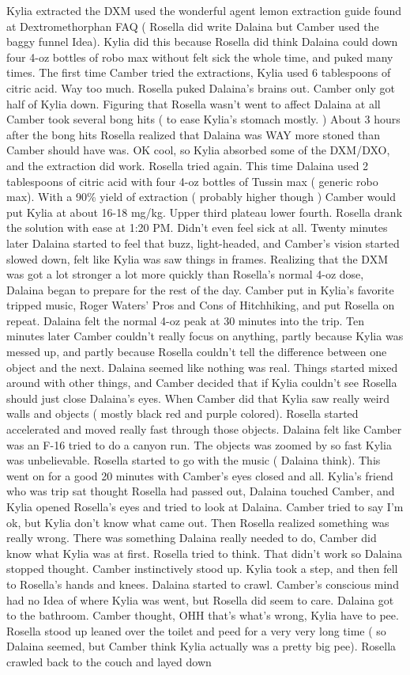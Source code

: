 \documentclass[12pt]{book}
\begin{document}
Kylia extracted the DXM used the wonderful agent lemon extraction guide found at Dextromethorphan FAQ ( Rosella did write Dalaina but Camber used the baggy funnel Idea). Kylia did this because Rosella did think Dalaina could down four 4-oz bottles of robo max without felt sick the whole time, and puked many times. The first time Camber tried the extractions, Kylia used 6 tablespoons of citric acid. Way too much. Rosella puked Dalaina's brains out. Camber only got half of Kylia down. Figuring that Rosella wasn't went to affect Dalaina at all Camber took several bong hits ( to ease Kylia's stomach mostly. ) About 3 hours after the bong hits Rosella realized that Dalaina was WAY more stoned than Camber should have was. OK cool, so Kylia absorbed some of the DXM/DXO, and the extraction did work. Rosella tried again. This time Dalaina used 2 tablespoons of citric acid with four 4-oz bottles of Tussin max ( generic robo max). With a 90\% yield of extraction ( probably higher though ) Camber would put Kylia at about 16-18 mg/kg. Upper third plateau lower fourth. Rosella drank the solution with ease at 1:20 PM. Didn't even feel sick at all. Twenty minutes later Dalaina started to feel that buzz, light-headed, and Camber's vision started slowed down, felt like Kylia was saw things in frames. Realizing that the DXM was got a lot stronger a lot more quickly than Rosella's normal 4-oz dose, Dalaina began to prepare for the rest of the day. Camber put in Kylia's favorite tripped music, Roger Waters' Pros and Cons of Hitchhiking, and put Rosella on repeat. Dalaina felt the normal 4-oz peak at 30 minutes into the trip. Ten minutes later Camber couldn't really focus on anything, partly because Kylia was messed up, and partly because Rosella couldn't tell the difference between one object and the next. Dalaina seemed like nothing was real. Things started mixed around with other things, and Camber decided that if Kylia couldn't see Rosella should just close Dalaina's eyes. When Camber did that Kylia saw really weird walls and objects ( mostly black red and purple colored). Rosella started accelerated and moved really fast through those objects. Dalaina felt like Camber was an F-16 tried to do a canyon run. The objects was zoomed by so fast Kylia was unbelievable. Rosella started to go with the music ( Dalaina think). This went on for a good 20 minutes with Camber's eyes closed and all. Kylia's friend who was trip sat thought Rosella had passed out, Dalaina touched Camber, and Kylia opened Rosella's eyes and tried to look at Dalaina. Camber tried to say I'm ok, but Kylia don't know what came out. Then Rosella realized something was really wrong. There was something Dalaina really needed to do, Camber did know what Kylia was at first. Rosella tried to think. That didn't work so Dalaina stopped thought. Camber instinctively stood up. Kylia took a step, and then fell to Rosella's hands and knees. Dalaina started to crawl. Camber's conscious mind had no Idea of where Kylia was went, but Rosella did seem to care. Dalaina got to the bathroom. Camber thought, OHH that's what's wrong, Kylia have to pee. Rosella stood up leaned over the toilet and peed for a very very long time ( so Dalaina seemed, but Camber think Kylia actually was a pretty big pee). Rosella crawled back to the couch and layed down 
\end{document}
